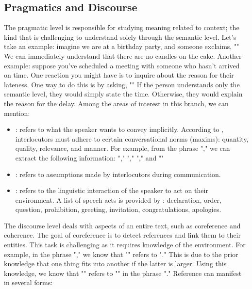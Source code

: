 \documentclass{KBook}
\begin{document}
\subsection{Pragmatics and Discourse}

The pragmatic level is responsible for studying meaning related to context; the kind that is challenging to understand solely through the semantic level. Let's take an example: imagine we are at a birthday party, and someone exclaims, "" We can immediately understand that there are no candles on the cake. Another example: suppose you've scheduled a meeting with someone who hasn't arrived on time. One reaction you might have is to inquire about the reason for their lateness. One way to do this is by asking, "" If the person understands only the semantic level, they would simply state the time. Otherwise, they would explain the reason for the delay. Among the areas of interest in this branch, we can mention:

\begin{itemize}
	\item {}: refers to what the speaker wants to convey implicitly. According to \citet{1979-Grice}, interlocutors must adhere to certain conversational norms (maxims): quantity, quality, relevance, and manner. For example, from the phrase "," we can extract the following information: "," "," "," and ""
	
	\item {}: refers to assumptions made by interlocutors during communication.
	
	\item {}: refers to the linguistic interaction of the speaker to act on their environment. A list of speech acts is provided by \citet{1962-austin}: declaration, order, question, prohibition, greeting, invitation, congratulations, apologies.
\end{itemize}

The discourse level deals with aspects of an entire text, such as coreference and coherence. The goal of coreference is to detect references and link them to their entities. This task is challenging as it requires knowledge of the environment. For example, in the phrase "," we know that "" refers to "." This is due to the prior knowledge that one thing fits into another if the latter is larger. Using this knowledge, we know that "" refers to "" in the phrase "." Reference can manifest in several forms:
\end{document}
